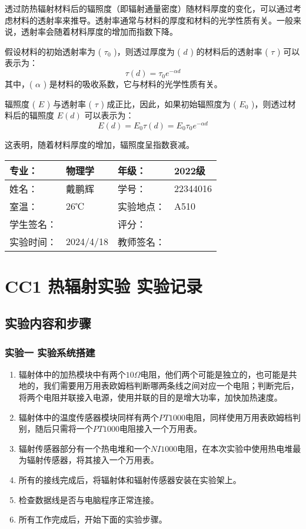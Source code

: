 \documentclass[dvipsnames, svgnames,a4paper,11pt]{article}
\begin{document}
	透过防热辐射材料后的辐照度（即辐射通量密度）随材料厚度的变化，可以通过考虑材料的透射率来推导。透射率通常与材料的厚度和材料的光学性质有关。一般来说，透射率会随着材料厚度的增加而指数下降。
	
	假设材料的初始透射率为 ( $\tau_0$ )，则透过厚度为 ( $d$ ) 的材料后的透射率 ( $\tau$ ) 可以表示为：
	\[
		\tau(d)=\tau_0e^{-\alpha d}
	\]
	其中，( $\alpha$ ) 是材料的吸收系数，它与材料的光学性质有关。
	
	辐照度 ( $E$ ) 与透射率 ( $\tau$ ) 成正比，因此，如果初始辐照度为 ( $E_0$ )，则透过材料后的辐照度  $E(d)$  可以表示为：
	\[
		E(d)=E_0\tau(d)=E_0\tau_0 e^{-\alpha d}
	\]
	
	这表明，随着材料厚度的增加，辐照度呈指数衰减。






\clearpage
\begin{table}
	\renewcommand\arraystretch{1.7}
	\centering
	\begin{tabularx}{\textwidth}{|X|X|X|X|}
	\hline
	专业：& 物理学 &年级：& 2022级 \\
	\hline
	姓名：& 戴鹏辉 & 学号：& 22344016 \\
	\hline
	室温：& 26℃ & 实验地点： & A510 \\
	\hline
	学生签名：& & 评分： &\\
	\hline
	实验时间：& 2024/4/18 & 教师签名：&\\
	\hline
	\end{tabularx}
\end{table}

\section{CC1 \quad 热辐射实验 \quad\heiti 实验记录}
\subsection{实验内容和步骤}

\subsubsection{实验一 \quad 实验系统搭建}

	
	\begin{enumerate}
		\item 辐射体中的加热模块中有两个$10\Omega$电阻，他们两个可能是独立的，也可能是共地的，我们需要用万用表欧姆档判断哪两条线之间对应一个电阻；判断完后，将两个电阻并联接入电源，使用并联的目的是增大功率，加快加热速度。
		\item 辐射体中的温度传感器模块同样有两个$PT1000$电阻，同样使用万用表欧姆档判别，随后只需将一个$PT1000$电阻接入一个万用表。
		\item 辐射传感器部分有一个热电堆和一个$NI1000$电阻，在本次实验中使用热电堆最为辐射传感器，将其接入一个万用表。
		\item 所有的接线完成后，将辐射体和辐射传感器安装在实验架上。
		\item 检查数据线是否与电脑程序正常连接。
		\item 所有工作完成后，开始下面的实验步骤。
	\end{enumerate}
\end{document}
